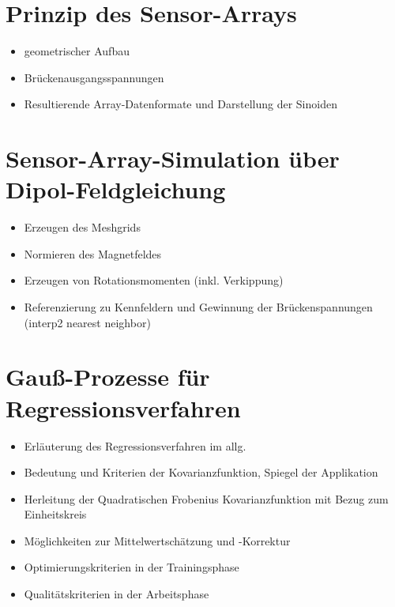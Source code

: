 	
	\clearpage
	
	
\section{Prinzip des Sensor-Arrays}\label{sec:prinzip-des-sensor-arrays}
	\begin{itemize}
		\item geometrischer Aufbau
		\item Brückenausgangsspannungen
		\item Resultierende Array-Datenformate und Darstellung der Sinoiden
	\end{itemize}

\section{Sensor-Array-Simulation über Dipol-Feldgleichung}\label{sec:sensor-array-simulation-dipol-feldgleichung}
	\begin{itemize}
		\item Erzeugen des Meshgrids
		\item Normieren des Magnetfeldes
		\item Erzeugen von Rotationsmomenten (inkl. Verkippung)
		\item Referenzierung zu Kennfeldern und Gewinnung der Brückenspannungen (interp2 nearest neighbor)
	\end{itemize}

\section{Gauß-Prozesse für Regressionsverfahren}\label{sec:gauss-prozesse-regressionsverfahren}
	\begin{itemize}
		\item Erläuterung des Regressionsverfahren im allg.
		\item Bedeutung und Kriterien der Kovarianzfunktion, Spiegel der Applikation
		\item Herleitung der Quadratischen Frobenius Kovarianzfunktion mit Bezug zum Einheitskreis
		\item Möglichkeiten zur Mittelwertschätzung und -Korrektur
		\item Optimierungskriterien in der Trainingsphase
		\item Qualitätskriterien in der Arbeitsphase
	\end{itemize}